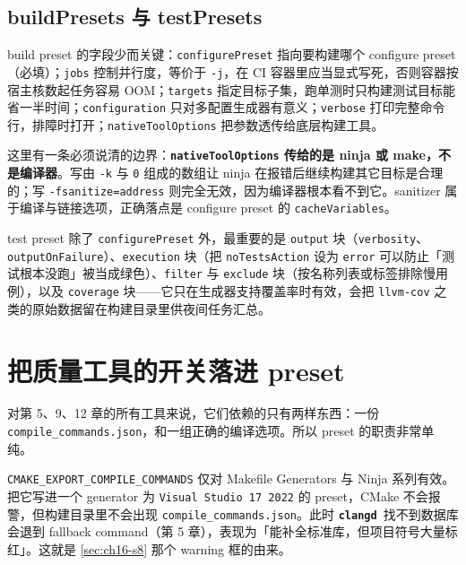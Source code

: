 \documentclass[12pt,a4paper,fontset=fandol]{ctexbook}
\newcommand{\Bk}{\discretionary{}{}{}}
\newcommand{\Lib}[1]{\textbf{\texttt{#1}}}
\newcommand{\CD}{\Lib{clangd}}
\begin{document}
\subsection{buildPresets 与 testPresets}\label{sec:ch16-s3}

build preset 的字段少而关键：\texttt{configurePreset} 指向要构建哪个 configure preset（必填）；\texttt{jobs} 控制并行度，等价于 \texttt{-j}，在 CI 容器里应当显式写死，否则容器按宿主核数起任务容易 OOM；\texttt{targets} 指定目标子集，跑单测时只构建测试目标能省一半时间；\texttt{configuration} 只对多配置生成器有意义；\texttt{verbose} 打印完整命令行，排障时打开；\texttt{nativeToolOptions} 把参数透传给底层构建工具。

这里有一条必须说清的边界：\textbf{\texttt{nativeToolOptions} 传给的是 ninja 或 make，不是编译器}。写由 \texttt{-k} 与 \texttt{0} 组成的数组让 ninja 在报错后继续构建其它目标是合理的；写 \texttt{-fsanitize=address} 则完全无效，因为编译器根本看不到它。sanitizer 属于编译与链接选项，正确落点是 configure preset 的 \texttt{cacheVariables}。

test preset 除了 \texttt{configure{\Bk}Preset} 外，最重要的是 \texttt{output} 块（\texttt{verbosity}、\texttt{output{\Bk}On{\Bk}Failure}）、\texttt{execution} 块（把 \texttt{no{\Bk}Tests{\Bk}Action} 设为 \texttt{error} 可以防止「测试根本没跑」被当成绿色）、\texttt{filter} 与 \texttt{exclude} 块（按名称列表或标签排除慢用例），以及 \texttt{coverage} 块——它只在生成器支持覆盖率时有效，会把 \texttt{llvm-cov} 之类的原始数据留在构建目录里供夜间任务汇总。

\section{把质量工具的开关落进 preset}\label{sec:ch16-s4}

对第 5、9、12 章的所有工具来说，它们依赖的只有两样东西：一份\texttt{compile\allowbreak\_\allowbreak commands.json}，和一组正确的编译选项。所以 preset 的职责非常单纯。

\begin{note}[title={编译数据库开关只认生成器}]
\texttt{CMAKE\_EXPORT\_COMPILE\_COMMANDS} 仅对 Makefile Generators 与 Ninja 系列有效。把它写进一个 generator 为 \texttt{Visual Studio 17 2022} 的 preset，CMake 不会报警，但构建目录里不会出现 \texttt{compile\_commands.json}。此时 \CD\ 找不到数据库会退到 fallback command（第 5 章），表现为「能补全标准库，但项目符号大量标红」。这就是 \ref{sec:ch16-s8} 那个 warning 框的由来。
\end{note}
\end{document}
